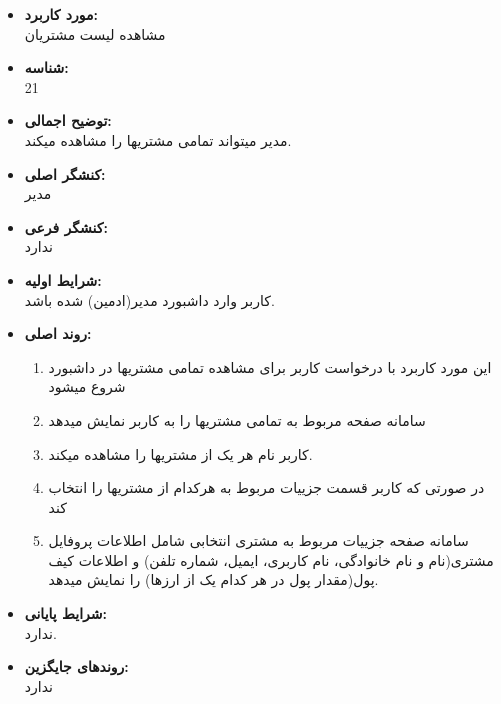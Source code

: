 \documentclass{article}
\begin{document}
\begin{itemize}
\item \textbf{مورد کاربرد:}\\
مشاهده لیست مشتریان
\item \textbf{شناسه:}\\
21
\item \textbf{توضیح اجمالی:}\\
مدیر میتواند تمامی مشتریها را مشاهده میکند.
\item \textbf{کنشگر اصلی:}\\
مدیر
\item \textbf{کنشگر فرعی:}\\
ندارد
\item \textbf{شرایط اولیه:}\\
کاربر وارد داشبورد مدیر(ادمین) شده باشد.
\item \textbf{روند اصلی:}\\
\begin{enumerate}
\item  این مورد کاربرد با درخواست کاربر برای مشاهده تمامی  مشتریها در داشبورد شروع میشود
\item سامانه صفحه مربوط به تمامی مشتریها را به کاربر نمایش میدهد
\item کاربر نام هر یک از مشتریها را مشاهده میکند.
\item  در صورتی که کاربر قسمت جزییات مربوط به هرکدام از مشتریها را انتخاب کند
\item سامانه صفحه جزییات مربوط به مشتری انتخابی شامل اطلاعات پروفایل مشتری(نام و نام خانوادگی، نام کاربری، ایمیل، شماره تلفن) و اطلاعات کیف پول(مقدار پول در هر کدام یک از ارزها) را نمایش میدهد.
\end{enumerate}
\item \textbf{شرایط پایانی:}\\ 
ندارد.
\item \textbf{روندهای جایگزین:}\\
ندارد
\end{itemize}
\noindent\makebox[\linewidth]{\rule{\paperwidth}{0.4pt}}
\end{document}
